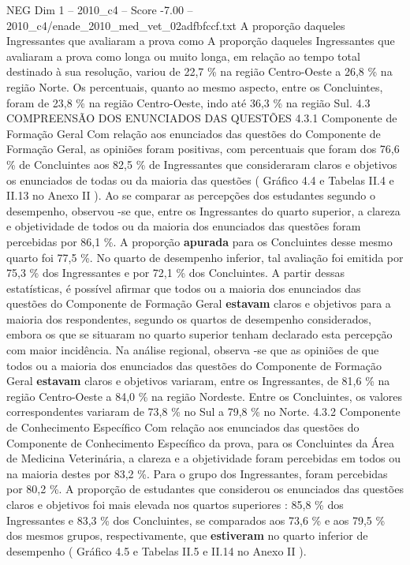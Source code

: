 \begin{textsample}{NEG Dim 1 – 2010\_c4 – Score -7.00 – 2010\_c4/enade\_2010\_med\_vet\_02adfbfccf.txt}
A proporção daqueles Ingressantes que avaliaram a prova como A proporção daqueles Ingressantes que avaliaram a prova como longa ou muito longa, em relação ao tempo total destinado à sua resolução, variou de 22,7 \% na região Centro-Oeste a 26,8 \% na região Norte.
Os percentuais, quanto ao mesmo aspecto, entre os Concluintes, foram de 23,8 \% na região Centro-Oeste, indo até 36,3 \% na região Sul. 4.3 COMPREENSÃO DOS ENUNCIADOS DAS QUESTÕES 4.3.1 Componente de Formação Geral Com relação aos enunciados das questões do Componente de Formação Geral, as opiniões foram positivas, com percentuais que foram dos 76,6 \% de Concluintes aos 82,5 \% de Ingressantes que consideraram claros e objetivos os enunciados de todas ou da maioria das questões ( Gráfico 4.4 e Tabelas II.4 e II.13 no Anexo II ).
Ao se comparar as percepções dos estudantes segundo o desempenho, observou -se que, entre os Ingressantes do quarto superior, a clareza e objetividade de todos ou da maioria dos enunciados das questões foram percebidas por 86,1 \%.
A proporção \textbf{apurada} para os Concluintes desse mesmo quarto foi 77,5 \%.
No quarto de desempenho inferior, tal avaliação foi emitida por 75,3 \% dos Ingressantes e por 72,1 \% dos Concluintes.
A partir dessas estatísticas, é possível afirmar que todos ou a maioria dos enunciados das questões do Componente de Formação Geral \textbf{estavam} claros e objetivos para a maioria dos respondentes, segundo os quartos de desempenho considerados, embora os que se situaram no quarto superior tenham declarado esta percepção com maior incidência.
Na análise regional, observa -se que as opiniões de que todos ou a maioria dos enunciados das questões do Componente de Formação Geral \textbf{estavam} claros e objetivos variaram, entre os Ingressantes, de 81,6 \% na região Centro-Oeste a 84,0 \% na região Nordeste.
Entre os Concluintes, os valores correspondentes variaram de 73,8 \% no Sul a 79,8 \% no Norte. 4.3.2 Componente de Conhecimento Específico Com relação aos enunciados das questões do Componente de Conhecimento Específico da prova, para os Concluintes da Área de Medicina Veterinária, a clareza e a objetividade foram percebidas em todos ou na maioria destes por 83,2 \%.
Para o grupo dos Ingressantes, foram percebidas por 80,2 \%.
A proporção de estudantes que considerou os enunciados das questões claros e objetivos foi mais elevada nos quartos superiores : 85,8 \% dos Ingressantes e 83,3 \% dos Concluintes, se comparados aos 73,6 \% e aos 79,5 \% dos mesmos grupos, respectivamente, que \textbf{estiveram} no quarto inferior de desempenho ( Gráfico 4.5 e Tabelas II.5 e II.14 no Anexo II ).

\end{textsample}
